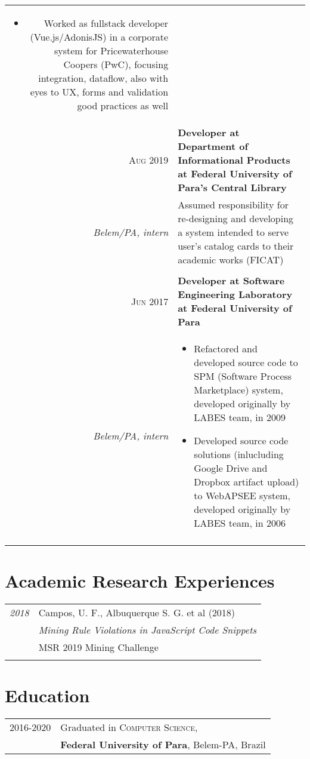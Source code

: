 \documentclass[a4paper,10pt]{article}
\begin{document}
\begin{supertabular}{r|p{11cm}}
\begin{itemize}
    \item \footnotesize{Worked as fullstack developer (Vue.js/AdonisJS) in a corporate system for Pricewaterhouse Coopers (PwC), focusing integration, dataflow, also with eyes to UX, forms and validation good practices as well}
  \end{itemize}\\
\textsc{Aug 2019} & \textbf{Developer at Department of Informational Products at Federal University of Para's Central Library}\\
\footnotesize{\textit{Belem/PA, intern}}
  & \footnotesize{Assumed responsibility for re-designing and developing a system intended to serve user's catalog cards to their academic works (FICAT)}\\\\
\textsc{Jun 2017} & \textbf{Developer at Software Engineering Laboratory at Federal University of Para}\\
\footnotesize{\textit{Belem/PA, intern}}
  &\begin{itemize}
    \item \footnotesize{Refactored and developed source code to SPM (Software Process Marketplace) system, developed originally by LABES team, in 2009}
    \item \footnotesize{Developed source code solutions (inlucluding Google Drive and Dropbox artifact upload) to WebAPSEE system, developed originally by LABES team, in 2006}
  \end{itemize}\\
\\
\end{supertabular}

\section{Academic Research Experiences}
\begin{tabular}{r|p{11cm}}
 \emph{2018} & Campos, U. F., Albuquerque S. G. et al (2018)\\
 & \textit{Mining Rule Violations in JavaScript Code Snippets}\\
 & MSR 2019 Mining Challenge\\\multicolumn{2}{c}{} \\
\end{tabular}

\section{Education}
\begin{tabular}{rl}	
2016-2020 & Graduated in \textsc{Computer Science}, \\
& \textbf{Federal University of Para}, Belem-PA, Brazil
\end{tabular}
\end{document}
